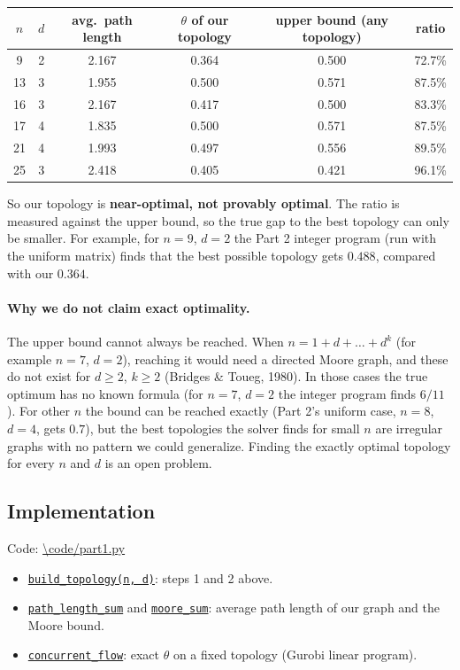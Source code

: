 \begin{center}
\begin{tabular}{cc|c|c|c|c}
$n$ & $d$ & avg.\ path length & $\theta$ of our topology & upper bound (any topology) & ratio \\ \hline
9  & 2 & 2.167 & 0.364 & 0.500 & 72.7\% \\
13 & 3 & 1.955 & 0.500 & 0.571 & 87.5\% \\
16 & 3 & 2.167 & 0.417 & 0.500 & 83.3\% \\
17 & 4 & 1.835 & 0.500 & 0.571 & 87.5\% \\
21 & 4 & 1.993 & 0.497 & 0.556 & 89.5\% \\
25 & 3 & 2.418 & 0.405 & 0.421 & 96.1\% \\
\end{tabular}
\end{center}

So our topology is \textbf{near-optimal, not provably optimal}. The ratio is measured against the
upper bound, so the true gap to the best topology can only be smaller. For example, for $n = 9$,
$d = 2$ the Part 2 integer program (run with the uniform matrix) finds that the best possible
topology gets $0.488$, compared with our $0.364$.

\paragraph{Why we do not claim exact optimality.} The upper bound cannot always be reached. When
$n = 1 + d + \dots + d^k$ (for example $n = 7$, $d = 2$), reaching it would need a directed Moore
graph, and these do not exist for $d \ge 2$, $k \ge 2$ (Bridges \& Toueg, 1980). In those cases the true optimum
has no known formula (for $n = 7$, $d = 2$ the integer program finds $6/11$). For other $n$ the
bound can be reached exactly (Part 2's uniform case, $n = 8$, $d = 4$, gets $0.7$), but the best
topologies the solver finds for small $n$ are irregular graphs with no pattern we could generalize.
Finding the exactly optimal topology for every $n$ and $d$ is an open problem.

\subsection*{Implementation}

Code: \url{\code/part1.py}
\begin{itemize}
  \item \href{\code/part1.py\#L7-L17}{\texttt{build\_topology(n, d)}}: steps 1 and 2 above.
  \item \href{\code/part1.py\#L20-L36}{\texttt{path\_length\_sum}} and
        \href{\code/part1.py\#L39-L47}{\texttt{moore\_sum}}: average path length of our graph and
        the Moore bound.
  \item \href{\code/part1.py\#L50-L69}{\texttt{concurrent\_flow}}: exact $\theta$ on a fixed topology
        (Gurobi linear program).
\end{itemize}

